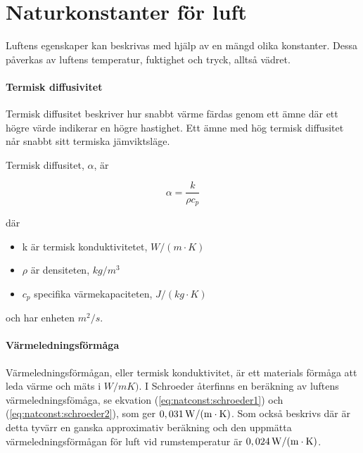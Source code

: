 \section{Naturkonstanter för luft}
Luftens egenskaper kan beskrivas med hjälp av en mängd olika konstanter. Dessa påverkas av luftens temperatur, fuktighet och tryck, alltså vädret.


\paragraph{Termisk diffusivitet}

Termisk diffusitet beskriver hur snabbt värme färdas genom ett ämne där ett högre värde indikerar en högre hastighet. Ett ämne med hög termisk diffusitet når snabbt sitt termiska jämviktsläge.

Termisk diffusitet, $\alpha$, är \cite{termiskdiffusivitet}

\begin{equation}
\alpha=\frac{k}{\rho c_p}
\end{equation}

där 
\begin{itemize}
   \item[] k är termisk konduktivitetet, $\unit{W/(m\cdot K)}$
   \item[] $\rho$ är densiteten, $\unit{kg/m^3}$
   \item[] $c_p$ specifika värmekapaciteten, $\unit{J/(kg\cdot K)}$
\end{itemize}

och har enheten $\unit{m^2/s}$.




\paragraph{Värmeledningsförmåga} %
Värmeledningsförmågan, eller termisk konduktivitet, är ett materials förmåga att leda värme och mäts i $\unit{W/ mK)}$. I Schroeder \cite{schroeder00} återfinns en beräkning av luftens värmeledningsfömåga, se ekvation (\ref{eq:natconst:schroeder1}) och (\ref{eq:natconst:schroeder2}), som ger $\unit[0,031]{W/(m\cdot K)}$. Som också beskrivs där är detta tyvärr en ganska approximativ beräkning och den uppmätta värmeledningsförmågan för luft vid rumstemperatur är $\unit[0,024]{W/(m\cdot K)}$.

